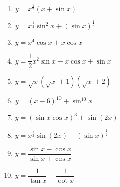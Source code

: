 \documentclass[a4paper,12pt]{article}
\begin{document}
\begin{enumerate}
\begin{multicols}{2}
\begin{enumerate}
\item $y=x^{\frac{1}{2}}(x+\sin x)$
\item $y=x^{\frac{1}{2}}\sin^2 x+(\sin x)^{\frac{1}{2}}$
\item $y=x^4 \cos x+x\cos x$
\item $y=\dfrac{1}{2}x^2\sin x-x\cos x+\sin x$
\item $y=\sqrt{x}(\sqrt{x}+1)(\sqrt{x}+2)$
\item $y=(x-6)^{10}+\sin^{10} x$
\item $y=(\sin x\cos x)^3+\sin (2x)$
\item $y=x^{\frac{1}{2}} \sin (2x) +(\sin x)^{\frac{1}{2}}$
\item $y=\dfrac{\sin x-\cos x}{\sin x+\cos x}$
\item $y=\dfrac{1}{\tan x}-\dfrac{1}{\cot x}$
\end{enumerate}
\end{multicols}
\end{enumerate}
\end{document}
